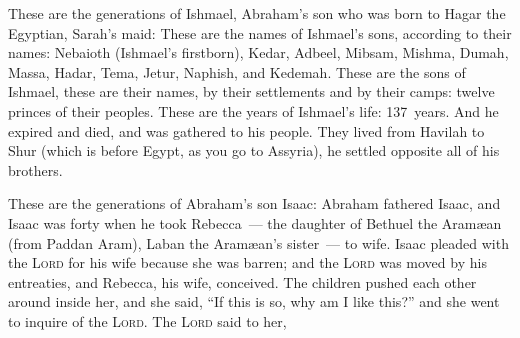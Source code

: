 \begin{inparaenum}
   These are the generations of Ishmael, Abraham's son who was born to Hagar the Egyptian, Sarah's maid:%
   These are the names of Ishmael's sons, according to their names: Nebaioth (Ishmael's firstborn), Kedar, Adbeel, Mibsam,%
   Mishma, Dumah, Massa,%
   Hadar, Tema, Jetur, Naphish, and Kedemah.%
   These are the sons of Ishmael, these are their names, by their settlements and by their camps: twelve princes of their peoples.%
   These are the years of Ishmael's life: 137~years. And he expired and died, and was gathered to his people.%
   They lived from Havilah to Shur (which is before Egypt, as you go to Assyria), he settled opposite all of his brothers.%
  
   These are the generations of Abraham's son Isaac: Abraham fathered Isaac,%
   and Isaac was forty when he took Rebecca~--- the daughter of Bethuel the Aram\ae an (from Paddan Aram), Laban the Aram\ae an's sister~--- to wife.%
   Isaac pleaded with the \textsc{Lord} for his wife because she was barren; and the \textsc{Lord} was moved by his entreaties, and Rebecca, his wife, conceived.%
   The children pushed each other around inside her, and she said, ``If this is so, why am I like this?'' and she went to inquire of the \textsc{Lord}.%
   The \textsc{Lord} said to her,\smallskip%
  
  
  

\end{inparaenum}
